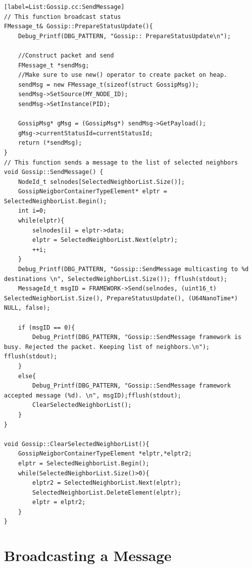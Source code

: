 \begin{lstlisting}[style=boralargefile] [label=List:Gossip.cc:SendMessage]
// This function broadcast status
FMessage_t& Gossip::PrepareStatusUpdate(){
	Debug_Printf(DBG_PATTERN, "Gossip:: PrepareStatusUpdate\n");
	
	//Construct packet and send
	FMessage_t *sendMsg;
	//Make sure to use new() operator to create packet on heap.
	sendMsg = new FMessage_t(sizeof(struct GossipMsg));
	sendMsg->SetSource(MY_NODE_ID);
	sendMsg->SetInstance(PID);
	
	GossipMsg* gMsg = (GossipMsg*) sendMsg->GetPayload();
	gMsg->currentStatusId=currentStatusId;
	return (*sendMsg);
}
// This function sends a message to the list of selected neighbors
void Gossip::SendMessage() {
	NodeId_t selnodes[SelectedNeighborList.Size()];
	GossipNeigborContainerTypeElement* elptr = SelectedNeighborList.Begin();
	int i=0;
	while(elptr){
		selnodes[i] = elptr->data;
		elptr = SelectedNeighborList.Next(elptr);
		++i;
	}
	Debug_Printf(DBG_PATTERN, "Gossip::SendMessage multicasting to %d destinations \n", SelectedNeighborList.Size()); fflush(stdout);
	MessageId_t msgID = FRAMEWORK->Send(selnodes, (uint16_t) SelectedNeighborList.Size(), PrepareStatusUpdate(), (U64NanoTime*) NULL, false);
	
	if (msgID == 0){
		Debug_Printf(DBG_PATTERN, "Gossip::SendMessage framework is busy. Rejected the packet. Keeping list of neighbors.\n"); fflush(stdout);
	}
	else{
		Debug_Printf(DBG_PATTERN, "Gossip::SendMessage framework accepted message (%d). \n", msgID);fflush(stdout);
		ClearSelectedNeighborList();
	}
}

void Gossip::ClearSelectedNeighborList(){
	GossipNeigborContainerTypeElement *elptr,*elptr2;
	elptr = SelectedNeighborList.Begin();
	while(SelectedNeighborList.Size()>0){
		elptr2 = SelectedNeighborList.Next(elptr);
		SelectedNeighborList.DeleteElement(elptr);
		elptr = elptr2;
	}
}
\end{lstlisting}

\section {Broadcasting a Message } \label{sec:BroadcastingMessages}

